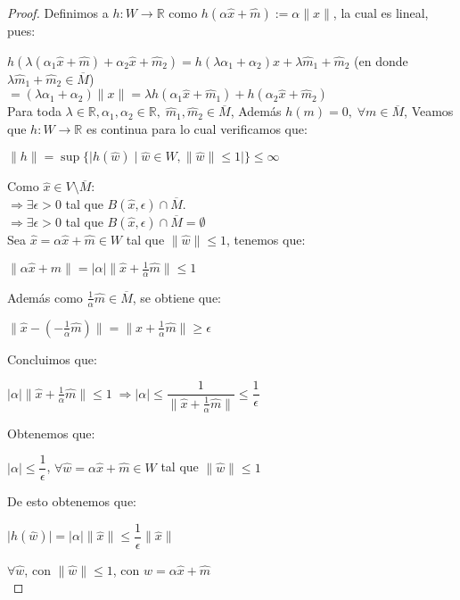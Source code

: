\documentclass[12pt,a4paper]{book}
\providecommand{\abs}[1]{\lvert#1\rvert}
\providecommand{\norm}[1]{\lVert#1\rVert}
\providecommand{\conj}[1]{\lbrace#1\rbrace}
\begin{document}
\begin{proof}
Definimos a $h:W\rightarrow\mathbb{R}$ como $h(\alpha\widehat{x}+\widehat{m}):=\alpha\norm{x}$, la cual es lineal, pues:

$h(\lambda(\alpha_{1}\widehat{x}+\widehat{m})+\alpha_{2}\widehat{x}+\widehat{m}_{2})=h(\lambda\alpha_{1}+\alpha_{2})\widehat{x}+\lambda\widehat{m}_{1}+\widehat{m}_{2}$ (en donde $\lambda\widehat{m}_{1}+\widehat{m}_{2}\in\overline{M}$)\\
$=(\lambda\alpha_{1}+\alpha_{2})\norm{x}=\lambda h(\alpha_{1}\widehat{x}+\widehat{m}_{1})+h(\alpha_{2}\widehat{x}+\widehat{m}_{2})$\\

Para toda $\lambda\in\mathbb{R},\alpha_{1},\alpha_{2}\in\mathbb{R},\;\widehat{m}_{1},\widehat{m}_{2}\in\overline{M}$, Además $h(m)=0,\;\forall m\in\overline{M}$, Veamos que $h:W\rightarrow\mathbb{R}$ es continua para lo cual verificamos que:
\begin{center}
$\norm{h}=\sup\conj{\abs{h(\widehat{w})\;|\; \widehat{w}\in W, \norm{\widehat{w}}\leq 1}}\leq\infty$
\end{center}
Como $\widehat{x}\in V\setminus\overline{M}$:\\

$\Rightarrow\exists\epsilon >0$ tal que $B(\widehat{x},\epsilon)\cap\overline{M}$.\\
$\Rightarrow\exists\epsilon >0$ tal que $B(\widehat{x},\epsilon)\cap\overline{M}=\emptyset$\\

Sea $\widehat{x}=\alpha\widehat{x}+\widehat{m}\in W$ tal que $\norm{\widehat{w}}\leq 1$, tenemos que:
\begin{center}
 $\norm{\alpha\widehat{x}+\widehat{m}}=\abs{\alpha}\norm{\widehat{x}+\frac{1}{\alpha}\widehat{m}}\leq 1$
\end{center}
Además como $\frac{1}{\alpha}\widehat{m}\in\overline{M}$, se obtiene que:
\begin{center}
 $\norm{\widehat{x}-(-\frac{1}{\alpha}\widehat{m})}=\norm{\widehat{x}+\frac{1}{\alpha}\widehat{m}}\geq\epsilon$
\end{center}
Concluimos que:
\begin{center}
$\abs{\alpha}\norm{\widehat{x}+\frac{1}{\alpha}\widehat{m}}\leq 1\; \Rightarrow \abs{\alpha}\leq \dfrac{1}{\norm{\widehat{x}+\frac{1}{\alpha}\widehat{m}}}\leq\dfrac{1}{\epsilon}$
\end{center}
Obtenemos que:
\begin{center}
$\abs{\alpha}\leq\dfrac{1}{\epsilon}$, $\forall\widehat{w}=\alpha\widehat{x}+\widehat{m}\in W$ tal que $\norm{\widehat{w}}\leq 1$
\end{center} 
De esto obtenemos que:
\begin{center}
$\abs{h(\widehat{w})}=\abs{\alpha}\norm{\widehat{x}}\leq\dfrac{1}{\epsilon}\norm{\widehat{x}}$
\end{center}
$\forall \widehat{w}$, con $\norm{\widehat{w}}\leq 1$, con $w=\alpha\widehat{x}+\widehat{m}$\\


\end{proof}
\end{document}
